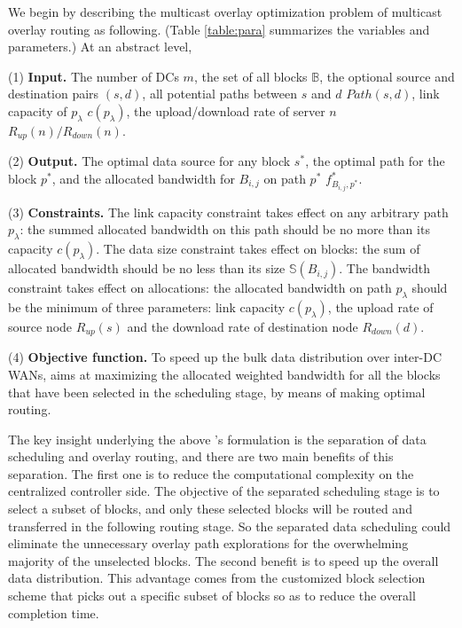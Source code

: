 We begin by describing the multicast overlay optimization problem 
of multicast 
overlay routing as following.
(Table \ref{table:para} summarizes the variables and parameters.)
At an abstract level, 


(1) \textbf{Input.} The number of DCs $m$, the set of all blocks $\mathbb{B}$, the optional source and destination pairs $(s,d)$, all potential paths between $s$ and $d$ $Path(s,d)$, link capacity of $p_\lambda$ $c(p_\lambda)$, the upload/download rate of server $n$ $R_{up}(n)/R_{down}(n)$.

(2) \textbf{Output.} The optimal data source for any block $s^*$, the optimal path for the block $p^*$, and the allocated bandwidth for $B_{i,j}$ on path $p^*$ $f^*_{B_{i,j},p^*}$.

(3) \textbf{Constraints.} The link capacity constraint takes effect on any arbitrary path $p_\lambda$: the summed allocated bandwidth on this path should be no more than its capacity $c(p_\lambda)$. The data size constraint takes effect on blocks: the sum of allocated bandwidth should be no less than its size $\mathbb{S}(B_{i,j})$. The bandwidth constraint takes effect on allocations: the allocated bandwidth on path $p_\lambda$ should be the minimum of three parameters: link capacity $c(p_\lambda)$, the upload rate of source node $R_{up}(s)$ and the download rate of destination node $R_{down}(d)$.

(4) \textbf{Objective function.} To speed up the bulk data distribution over inter-DC WANs, \name aims at maximizing the allocated weighted bandwidth for all the blocks that have been selected in the scheduling stage, by means of making optimal routing.

The key insight underlying the above \name's formulation is the separation of data scheduling and overlay routing, and there are two main benefits of this separation. The first one is to reduce the computational complexity on the centralized controller side. The objective of the separated scheduling stage is to select a subset of blocks, and only these selected blocks will be routed and transferred in the following routing stage. So the separated data scheduling could eliminate the unnecessary overlay path explorations for the overwhelming majority of the unselected blocks. The second benefit is to speed up the overall data distribution. This advantage comes from the customized block selection scheme that picks out a specific subset of blocks so as to reduce the overall completion time.

